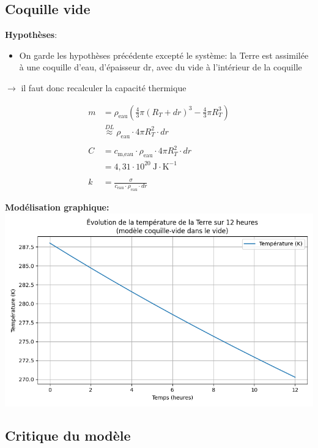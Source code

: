 \documentclass[a4paper,12pt]{article}
\begin{document}
\subsection{Coquille vide }
\textbf{Hypothèses}:
\begin{itemize}
    \item On garde les hypothèses précédente excepté le système: la Terre est assimilée à une coquille d'eau, d'épaisseur dr, avec du vide à l'intérieur de la coquille 
    
\end{itemize}
$\rightarrow$ il faut donc recalculer la capacité thermique 


\begin{align*}
m &= \rho_{\text{eau}} \left( \frac{4}{3} \pi (R_T + dr)^3 - \frac{4}{3} \pi R_T^3 \right) \\
&\overset{DL}{\approx} \rho_{\text{eau}} \cdot 4\pi R_T^2 \cdot dr \\
\\
C &= c_{\text{m,eau}} \cdot \rho_{\text{eau}} \cdot 4\pi R_T^2 \cdot dr \\
&= 4{,}31 \cdot 10^{20} \ \text{J} \cdot \text{K}^{-1} \\
\\
k &= \frac{\sigma }{c_{\text{eau}} \cdot \rho_{\text{eau}} \cdot dr}
\end{align*}

\textbf{Modélisation graphique:}    \includegraphics[width=0.8\linewidth]{../modele1/figures/modele1_coquille.png} 


\subsection{Critique du modèle}
\end{document}
